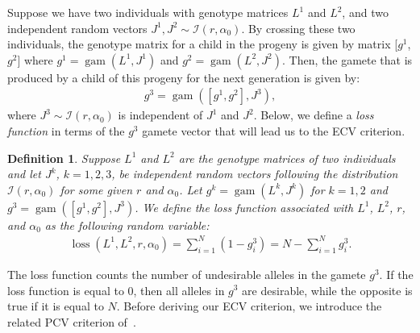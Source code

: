 \documentclass[12pt, a4paper, bibliography=totoc]{scrartcl}
\newtheorem{definition}{Definition}
\DeclareMathOperator*{\gam}{gam}
\DeclareMathOperator*{\loss}{loss}
\newcommand{\Iscr}{\mathcal{I}}
\begin{document}
Suppose we have two individuals with genotype matrices $L^1$ and $L^2$, and two independent random vectors $J^1,J^2\sim\Iscr(r,\alpha_0)$. By crossing these two individuals, the genotype matrix for a child in the progeny is given by matrix [$g^1$, $g^2$] where $g^1 = \gam(L^1,J^1)$ and $g^2 = \gam(L^2,J^2)$. Then, the gamete that is produced by a child of this progeny for the next generation is given by:
\begin{align} \label{eq:gamete_g3}
  g^3 = \gam\left(\left[g^1, g^2\right],J^3\right),
\end{align}
where $J^3\sim\Iscr(r,\alpha_0)$ is independent of $J^1$ and $J^2$. Below, we define a \textit{loss function} in terms of the $g^3$ gamete vector that will lead us to the ECV criterion. 

\begin{definition} \label{defn.loss_func} 
Suppose $L^1$ and $L^2$ are the genotype matrices of two individuals and let $J^k$,  $k=1,2,3$, be independent random vectors following the distribution $\Iscr(r,\alpha_0)$  for some given $r$ and $\alpha_0$. Let $g^k=\gam(L^k,J^k)$ for $k=1,2$ and $g^3=\gam([g^1,g^2],J^3)$. We define the loss function associated with $L^1$, $L^2$, $r$, and $\alpha_0$ as the following random variable:
\begin{align} \label{eq:loss_func}
    \loss(L^1,L^2,r,\alpha_0) = \sum_{i=1}^{N} (1-g_i^3) = N - \sum_{i=1}^{N}g_i^3.
\end{align}
\end{definition}


The loss function counts the number of undesirable alleles in the gamete $g^3$. If the loss function is equal to 0, then all alleles in $g^3$ are desirable, while the opposite is true if it is equal to $N$. Before deriving our ECV criterion, we introduce the related  PCV criterion of~\cite{han2017predicted}. 
 
\end{document}
